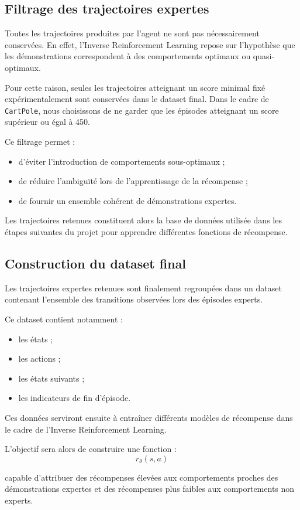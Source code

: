 \documentclass{article}
\begin{document}
\subsection{Filtrage des trajectoires expertes}

Toutes les trajectoires produites par l’agent ne sont pas nécessairement conservées. En effet, l’Inverse Reinforcement Learning repose sur l’hypothèse que les démonstrations correspondent à des comportements optimaux ou quasi-optimaux.

Pour cette raison, seules les trajectoires atteignant un score minimal fixé expérimentalement sont conservées dans le dataset final. Dans le cadre de \texttt{CartPole}, nous choisissons de ne garder que les épisodes atteignant un score supérieur ou égal à 450.

Ce filtrage permet :
\begin{itemize}
    \item d’éviter l’introduction de comportements sous-optimaux ;
    \item de réduire l’ambiguïté lors de l’apprentissage de la récompense ;
    \item de fournir un ensemble cohérent de démonstrations expertes.
\end{itemize}

Les trajectoires retenues constituent alors la base de données utilisée dans les étapes suivantes du projet pour apprendre différentes fonctions de récompense.

\subsection{Construction du dataset final}

Les trajectoires expertes retenues sont finalement regroupées dans un dataset contenant l’ensemble des transitions observées lors des épisodes experts.

Ce dataset contient notamment :
\begin{itemize}
    \item les états ;
    \item les actions ;
    \item les états suivants ;
    \item les indicateurs de fin d’épisode.
\end{itemize}

Ces données serviront ensuite à entraîner différents modèles de récompense dans le cadre de l’Inverse Reinforcement Learning.

L’objectif sera alors de construire une fonction :
\[
r_\theta(s,a)
\]

capable d’attribuer des récompenses élevées aux comportements proches des démonstrations expertes et des récompenses plus faibles aux comportements non experts.







\end{document}
